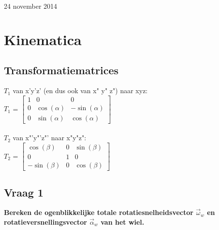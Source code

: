 \documentclass[a4paper,10pt]{article}
\begin{document}
\begin{titlepage}

{\large 24 november 2014}\\[3cm] %


 

\vfill %

\end{titlepage}
\pagestyle{fancy}
\fancyhf{}
\fancyfoot[R]{\thepage}
\section{Kinematica}
\subsection{Transformatiematrices}
$T_{1}$ van x'y'z' (en dus ook van x" y" z") naar xyz:\\
$T_{1}$ =
$\begin{bmatrix}
	1 & 0 & 0 \\
	0 & \cos(\alpha) & -\sin(\alpha) \\
	0 & \sin(\alpha) & \cos(\alpha)
\end{bmatrix}$\\\\
$T_{2}$ van x"'y"'z"' naar x"y"z": \\
$T_{2}$ =
$\begin{bmatrix}
	\cos(\beta) & 0 & \sin(\beta) \\
	0 & 1 & 0 \\
	-\sin(\beta) & 0 & \cos(\beta)
\end{bmatrix}$
\subsection{Vraag 1}
\textbf{Bereken de ogenblikkelijke totale rotatiesnelheidsvector $\vec{\omega}_{w}$ en rotatieversnellingsvector $\vec{\alpha}_{w}$ van het wiel.}\\
\end{document}
